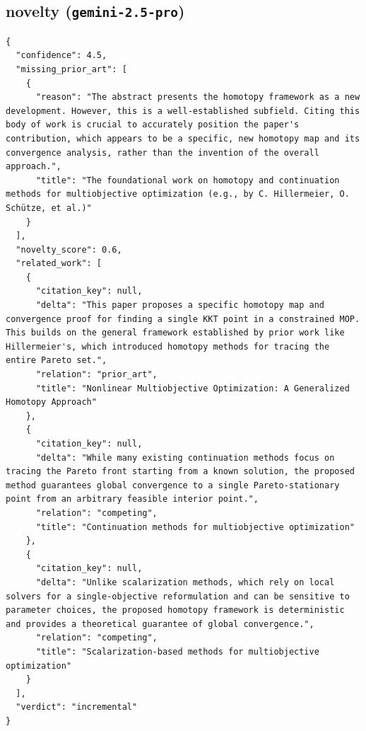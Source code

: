 \documentclass[11pt]{article}
\begin{document}
\subsection*{novelty (\texttt{gemini-2.5-pro})}
\begin{verbatim}
{
  "confidence": 4.5,
  "missing_prior_art": [
    {
      "reason": "The abstract presents the homotopy framework as a new development. However, this is a well-established subfield. Citing this body of work is crucial to accurately position the paper's contribution, which appears to be a specific, new homotopy map and its convergence analysis, rather than the invention of the overall approach.",
      "title": "The foundational work on homotopy and continuation methods for multiobjective optimization (e.g., by C. Hillermeier, O. Schütze, et al.)"
    }
  ],
  "novelty_score": 0.6,
  "related_work": [
    {
      "citation_key": null,
      "delta": "This paper proposes a specific homotopy map and convergence proof for finding a single KKT point in a constrained MOP. This builds on the general framework established by prior work like Hillermeier's, which introduced homotopy methods for tracing the entire Pareto set.",
      "relation": "prior_art",
      "title": "Nonlinear Multiobjective Optimization: A Generalized Homotopy Approach"
    },
    {
      "citation_key": null,
      "delta": "While many existing continuation methods focus on tracing the Pareto front starting from a known solution, the proposed method guarantees global convergence to a single Pareto-stationary point from an arbitrary feasible interior point.",
      "relation": "competing",
      "title": "Continuation methods for multiobjective optimization"
    },
    {
      "citation_key": null,
      "delta": "Unlike scalarization methods, which rely on local solvers for a single-objective reformulation and can be sensitive to parameter choices, the proposed homotopy framework is deterministic and provides a theoretical guarantee of global convergence.",
      "relation": "competing",
      "title": "Scalarization-based methods for multiobjective optimization"
    }
  ],
  "verdict": "incremental"
}
\end{verbatim}
\end{document}
